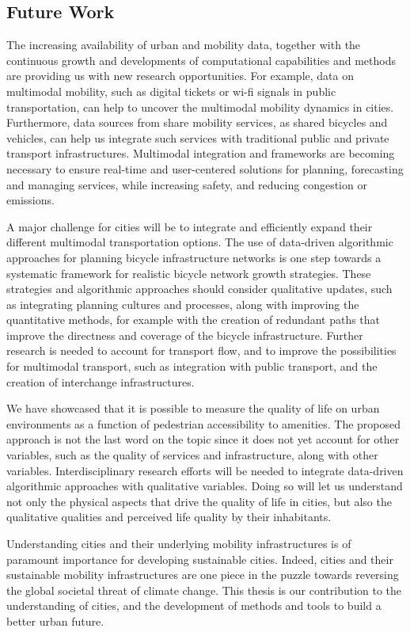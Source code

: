 \subsection*{Future Work}

The increasing availability of urban and mobility data, together with the continuous growth and developments of computational capabilities and methods are providing us with new research opportunities. For example, data on multimodal mobility, such as digital tickets or wi-fi signals in public transportation, can help to uncover the multimodal mobility dynamics in cities. Furthermore, data sources from share mobility services, as shared bicycles and vehicles, can help us integrate such services with traditional public and private transport infrastructures. Multimodal integration and frameworks are becoming necessary to ensure real-time and user-centered solutions for planning, forecasting and managing services, while increasing safety, and reducing congestion or emissions.

A major challenge for cities will be to integrate and efficiently expand their different multimodal transportation options. The use of data-driven algorithmic approaches for planning bicycle infrastructure networks is one step towards a systematic framework for realistic bicycle network growth strategies. These strategies and algorithmic approaches should consider  qualitative updates, such as integrating planning cultures and processes, along with improving the quantitative methods, for example with the creation of redundant paths that improve the directness and coverage of the bicycle infrastructure. Further research is needed to account for transport flow, and to improve the possibilities for multimodal transport, such as integration with public transport, and the creation of interchange infrastructures.

We have showcased that it is possible to measure the quality of life on urban environments as a function of pedestrian accessibility to amenities. The proposed approach is not the last word on the topic since it does not yet account for other variables, such as the quality of services and infrastructure, along with other variables. Interdisciplinary research efforts will be needed to integrate data-driven algorithmic approaches with qualitative variables. Doing so will let us understand not only the physical aspects that drive the quality of life in cities, but also the qualitative qualities and perceived life quality by their inhabitants.

Understanding cities and their underlying mobility infrastructures is of paramount importance for developing sustainable cities. Indeed, cities and their sustainable mobility infrastructures are one piece in the puzzle towards reversing the global societal threat of climate change. This thesis is our contribution to the understanding of cities, and the development of methods and tools to build a better urban future. 